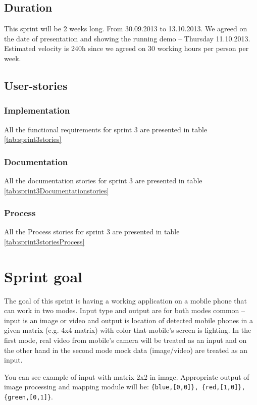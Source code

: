 \subsection{Duration}
This sprint will be 2 weeks long. From 30.09.2013 to 13.10.2013.
We agreed on the date of presentation and showing the running demo -- Thursday 11.10.2013.
Estimated velocity is 240h since we agreed on 30 working hours per person per week.

\subsection{User-stories}

\subsubsection*{Implementation}
All the functional requirements for sprint 3 are presented in table \ref{tab:sprint3stories}

\subsubsection*{Documentation}
All the documentation stories for sprint 3 are presented in table \ref{tab:sprint3Documentationstories}

\subsubsection*{Process}
All the Process stories for sprint 3 are presented in table \ref{tab:sprint3storiesProcess}

\section{Sprint goal}
The goal of this sprint is having a working application on a mobile phone that can work in two modes.  
Input type and output are for both modes common -- input is an image or video and output is location of detected mobile phones in a given matrix (e.g. 4x4 matrix) with color that mobile's screen is lighting.
In the first mode, real video from mobile's camera will be treated as an input and on the other hand in the second mode mock data (image/video) are treated as an input.

You can see example of input with matrix 2x2 in image. Appropriate output of image processing and mapping module will be: \texttt{\{blue,[0,0]\}, \{red,[1,0]\}, \{green,[0,1]\}}.
